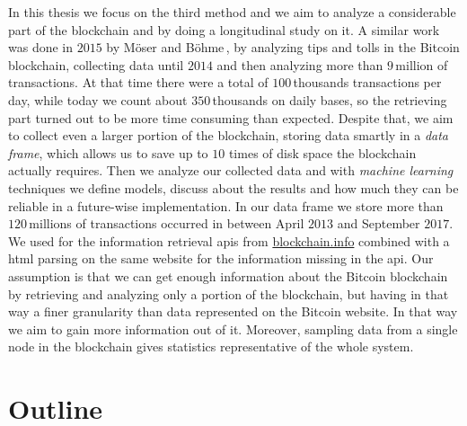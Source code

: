 \documentclass[USenglish]{uit-thesis}
\begin{document}
In this thesis we focus on the third method
and we aim to analyze a considerable
part of the blockchain and
by doing a longitudinal study on it.
A similar work was done in $2015$
by Möser and Böhme\,\cite{Moser2015},
by analyzing tips and tolls in the Bitcoin blockchain,
collecting data until $2014$
and then analyzing more than
$9$\,million of transactions.
At that time there were a total of $100$\,thousands
transactions per day, while today
we count about $350$\,thousands
on daily bases, so the retrieving part turned
out to be more time consuming than expected.
Despite that, we aim to collect even
a larger portion of the blockchain, storing data smartly in a
\emph{data frame}, which allows us to save
up to $10$ times of disk space the blockchain actually
requires. Then we analyze our collected data
and with \emph{machine learning}
techniques we define models, discuss about
the results and how much they can be
reliable in a future-wise implementation.
In our data frame we store more than
$120$\,millions of transactions occurred in between
April $2013$ and September $2017$.
We used for the information retrieval \gls{api}s from \url{blockchain.info}
combined with a \gls{html} parsing on the same
website for the information missing in the
\gls{api}.
Our assumption is that we can get enough information about the
Bitcoin blockchain by retrieving
and analyzing only a portion
of the blockchain, but having in that way a finer
granularity than data represented on the Bitcoin website.
In that way we aim to gain more information out of it.
Moreover, sampling data from a
single node in the blockchain gives statistics
representative of the whole system.
\section{Outline}
\label{sec:outline}
\end{document}

